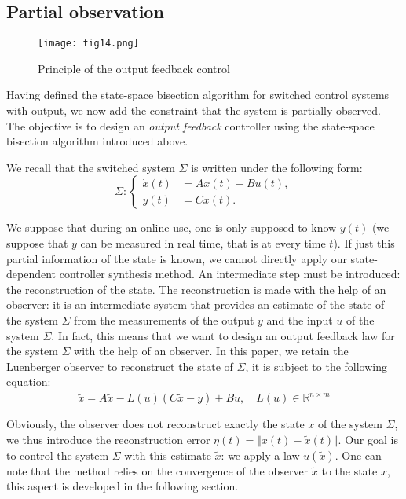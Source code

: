 \subsection{Partial observation}

\begin{figure}
 \centering
 \texttt{[image: fig14.png]}
 \caption{Principle of the output feedback control}
 \label{fig:fig14}
\end{figure}


Having defined the state-space bisection algorithm for switched control systems
with output, we now add the constraint that the system is partially observed.
The objective is to design an {\em output feedback} 
controller using the state-space bisection algorithm introduced above. 


We recall that the switched system $\Sigma$ is written under the following form:
\begin{equation*}
 \Sigma : \left\lbrace
\begin{array}{ll}
\dot x(t) & =A x(t)+B u(t), \\
 y(t) & =C x(t).
\end{array}
\right.
\end{equation*}

We suppose that during an online use, one is only supposed to know $y(t)$ (we suppose
that $y$ can be measured in real time, that is at every time $t$).
If just this partial information of the state is known, we cannot directly 
apply our state-dependent controller synthesis method. An intermediate 
step must be introduced: the reconstruction of the state. The reconstruction is made 
with the help of an observer: it is an intermediate system that provides 
an estimate of the state of the system $\Sigma$ from the measurements of the output $y$ and the 
input $u$ of the system $\Sigma$. In fact, this means that we want
to design an output feedback law for the system $\Sigma$ with the help of an observer.
In this paper, we retain the Luenberger observer \cite{ELO1987,alessandri2001,alessandri2007luenberger}
to reconstruct the 
state of $\Sigma$, it is subject to the following equation:
\begin{equation}
 \dot {\tilde x} = A \tilde x - L(u)(C \tilde x - y) + Bu, \quad L(u) \in \mathbb{R}^{n\times m}
\label{eq:luenberger}
 \end{equation}

Obviously, the observer does not reconstruct exactly the state $x$ of the system $\Sigma$, 
we thus introduce the reconstruction error $\eta(t) = \Vert x(t) - \tilde x(t) \Vert $.
Our goal is to control the system $\Sigma$ with this estimate $\tilde x$: we apply 
a law $u(\tilde x)$. One can note that the method relies on the convergence
of the observer $\tilde x$ to the state $x$, this aspect is developed in the following section.

